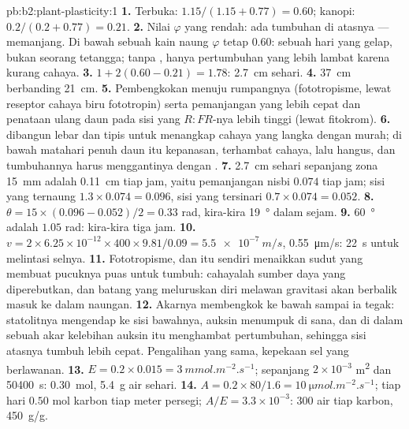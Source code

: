\begin{solution}{pb:b2:plant-plasticity:1}
\textbf{1.} Terbuka: $1.15/(1.15 + 0.77) = 0.60$; kanopi: $0.2/(0.2 +
0.77) = 0.21$.
\textbf{2.} Nilai $\varphi$ yang rendah: ada tumbuhan di atasnya ---
memanjang. Di bawah sebuah kain naung $\varphi$ tetap $0.60$: sebuah
hari yang gelap, bukan seorang tetangga; tanpa ,
hanya pertumbuhan yang lebih lambat karena kurang cahaya.
\textbf{3.} $1 + 2(0.60 - 0.21) = 1.78$: \qty{2.7}{cm} sehari.
\textbf{4.} \qty{37}{cm} berbanding \qty{21}{cm}.
\textbf{5.} Pembengkokan menuju rumpangnya (fototropisme, lewat
reseptor cahaya biru fototropin) serta pemanjangan yang lebih cepat dan
penataan ulang daun pada sisi yang $R{:}FR$-nya lebih tinggi (lewat
fitokrom).
\textbf{6.}  dibangun lebar dan tipis untuk menangkap
cahaya yang langka dengan murah; di bawah matahari penuh daun itu
kepanasan, terhambat cahaya, lalu hangus, dan tumbuhannya harus
menggantinya dengan .
\textbf{7.} \qty{2.7}{cm} sehari sepanjang zona \qty{15}{mm} adalah
\qty{0.11}{cm} tiap jam, yaitu pemanjangan nisbi $0.074$ tiap jam;
sisi yang ternaung $1.3\times 0.074 = 0.096$, sisi yang tersinari $0.7\times 0.074 =
0.052$.
\textbf{8.} $\theta = 15\times(0.096 - 0.052)/2 = 0.33$ rad, kira-kira
\qty{19}{\degree} dalam sejam.
\textbf{9.} \qty{60}{\degree} adalah $1.05$ rad: kira-kira tiga jam.
\textbf{10.} $v = 2\times 6.25\times 10^{-12}\times 400\times
9.81/0.09 = \qty{5.5e-7}{m/s}$, \qty{0.55}{\micro m/s}: \qty{22}{s}
untuk melintasi selnya.
\textbf{11.} Fototropisme, dan  itu sendiri
menaikkan sudut yang membuat pucuknya puas untuk tumbuh: cahayalah
sumber daya yang diperebutkan, dan batang yang meluruskan diri melawan
gravitasi akan berbalik masuk ke dalam naungan.
\textbf{12.} Akarnya membengkok ke bawah sampai ia tegak: statolitnya
mengendap ke sisi bawahnya, auksin menumpuk di sana, dan di dalam
sebuah akar kelebihan auksin itu menghambat pertumbuhan, sehingga sisi
atasnya tumbuh lebih cepat. Pengalihan yang sama, kepekaan sel yang
berlawanan.
\textbf{13.} $E = 0.2\times 0.015 = \qty{3}{mmol.m^{-2}.s^{-1}}$;
sepanjang $2\times 10^{-3}$ \unit{m^2} dan \qty{50400}{s}:
\qty{0.30}{mol}, \qty{5.4}{g} air sehari.
\textbf{14.} $A = 0.2\times 80/1.6 = \qty{10}{\micro mol.m^{-2}.s^{-1}}$;
tiap hari $0.50$ mol karbon tiap meter persegi; $A/E = 3.3\times
10^{-3}$: 300 air tiap karbon, \qty{450}{g/g}.

\end{solution}
